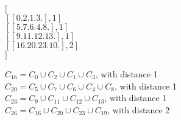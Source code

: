 \begin{minipage}{0.4\textwidth}
$[$\\
    $[[ 0.  2.  1.  3.], 1]$\\
    $[[ 5.  7.  6.  4.  8.], 1]$\\
    $[[ 9. 11.  12.  13. ], 1]$\\
    $[[16.  20.  23.  10.], 2]$  \\        
$]$\\
\end{minipage}  \hfill
\begin{minipage}{0.4\textwidth}
$C_{16} = C_0 \cup C_2 \cup C_1 \cup C_3$, with distance 1 \\  
$C_{20} = C_5 \cup C_7 \cup C_6 \cup C_4 \cup C_8$, with distance 1 \\ 
$C_{23} = C_9 \cup C_{11} \cup C_{12} \cup C_{13}$, with distance 1 \\ 
$C_{26} = C_{16} \cup C_{20} \cup C_{23} \cup C_{19}$, with distance 2 \\         
\end{minipage} 